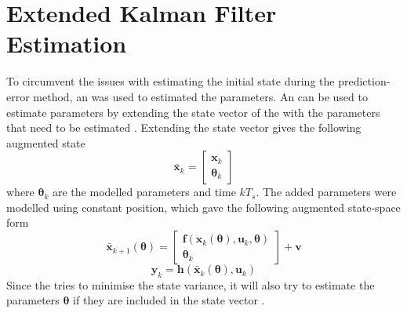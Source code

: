 \section{Extended Kalman Filter Estimation}\label{sec:KalmanEstimation} 
To circumvent the issues with estimating the initial state during the prediction-error method, an \abbrEKF was used to estimated the parameters. An \abbrEKF can be used to estimate parameters by extending the state vector of the \abbrEKF with the parameters that need to be estimated \citep{Roger}.   
Extending the state vector gives the following augmented state
\begin{equation}
\bar{\boldsymbol{x}}_k = \begin{bmatrix}
\boldsymbol{x}_k\\
\boldsymbol{\theta}_k
\end{bmatrix}
\end{equation}
where $\boldsymbol{\theta}_k$ are the modelled parameters and time $k T_s$.
The added parameters were modelled using constant position, which gave the following augmented state-space form 
\begin{equation}
\bar{\boldsymbol{x}}_{k+1}(\boldsymbol{\theta}) =\begin{bmatrix}
\boldsymbol{f}(\boldsymbol{x}_k(\boldsymbol{\theta}),\boldsymbol{u}_k,\boldsymbol{\theta})\\
\boldsymbol{\theta}_k
\end{bmatrix} 
+\boldsymbol{v}
\end{equation}
\begin{equation}
\boldsymbol{y}_k=\boldsymbol{h}(\bar{\boldsymbol{x}}_k(\boldsymbol{\theta}),\boldsymbol{u}_k)
\end{equation}
Since the \abbrEKF tries to minimise the state variance, it will also try to estimate the parameters $\boldsymbol{\theta}$ if they are included in the state vector \citep{Roger}.

